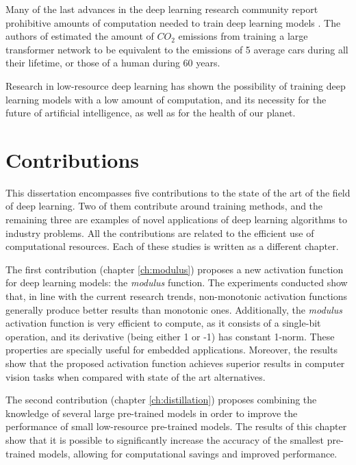 Many of the last advances in the deep learning research community report prohibitive amounts of computation needed to train deep learning models \autocite{silver2016, kechyn2018, brown2020, floridi2020}. The authors of \autocite{strubell2019} estimated the amount of $CO_2$ emissions from training a large transformer network to be equivalent to the emissions of 5 average cars during all their lifetime, or those of a human during 60 years. 

Research in low-resource deep learning \autocite{howard2017, Han2017, Gao2018, sanchez2020, so2021} has shown the possibility of training deep learning models with a low amount of computation, and its necessity for the future of artificial intelligence, as well as for the health of our planet.


\section{Contributions}
This dissertation encompasses five contributions to the state of the art of the field of deep learning. Two of them contribute around training methods, and the remaining three are examples of novel applications of deep learning algorithms to industry problems. All the contributions are related to the efficient use of computational resources. Each of these studies is written as a different chapter.

The first contribution (chapter \ref{ch:modulus}) proposes a new activation function for deep learning models: the \textit{modulus} function. The experiments conducted show that, in line with the current research trends, non-monotonic activation functions generally produce better results than monotonic ones. Additionally, the \textit{modulus} activation function is very efficient to compute, as it consists of a single-bit operation, and its derivative (being either 1 or -1) has constant 1-norm. These properties are specially useful for embedded applications. Moreover, the results show that the proposed activation function achieves superior results in computer vision tasks when compared with state of the art alternatives.

The second contribution (chapter \ref{ch:distillation}) proposes combining the knowledge of several large pre-trained models in order to improve the performance of small low-resource pre-trained models. The results of this chapter show that it is possible to significantly increase the accuracy of the smallest pre-trained models, allowing for computational savings and improved performance.

